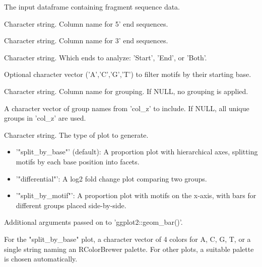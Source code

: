 \documentclass[a4paper]{book}
\begin{document}
\begin{Arguments}
\begin{ldescription}
\item[\code{df\_fragments}] The input dataframe containing fragment sequence data.

\item[\code{end\_motif\_5p}] Character string. Column name for 5' end sequences.

\item[\code{end\_motif\_3p}] Character string. Column name for 3' end sequences.

\item[\code{motif\_type}] Character string. Which ends to analyze: 'Start', 'End', or 'Both'.

\item[\code{motif\_start}] Optional character vector ('A','C','G','T') to filter motifs by their starting base.

\item[\code{col\_z}] Character string. Column name for grouping. If NULL, no grouping is applied.

\item[\code{vals\_z}] A character vector of group names from 'col\_z' to include. If NULL, all unique groups in 'col\_z' are used.

\item[\code{representation}] Character string. The type of plot to generate.
\begin{itemize}

\item{} '"split\_by\_base"' (default): A proportion plot with hierarchical axes, splitting motifs by each base position into facets.
\item{} '"differential"': A log2 fold change plot comparing two groups.
\item{} '"split\_by\_motif"': A proportion plot with motifs on the x-axis, with bars for different groups placed side-by-side.

\end{itemize}


\item[\code{...}] Additional arguments passed on to 'ggplot2::geom\_bar()'.

\item[\code{colors\_z}] For the "split\_by\_base" plot, a character vector of 4 colors for
A, C, G, T, or a single string naming an RColorBrewer palette. For other plots,
a suitable palette is chosen automatically.
\end{ldescription}
\end{Arguments}
\end{document}
